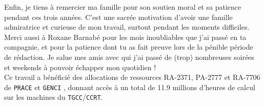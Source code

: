 \begin{intro}
Enfin, je tiens \`a remercier ma famille pour son soutien moral et sa patience pendant ces trois ann\'ees. C'est une sacr\'ee motivation d'avoir une famille admiratrice et curieuse de mon travail, surtout pendant les moments difficiles. Merci aussi \`a Roxane Barnab\'e pour les mois inoubliables que j'ai pass\'e en ta compagnie, et pour la patience dont tu as fait preuve lors de la p\'enible p\'eriode de r\'edaction. Je salue mes amis avec qui j'ai pass\'e de (trop) nombreuses soir\'ees et weekends \`a pouvoir \'echapper mon quotidien ! \\

Ce travail a b\'en\'efici\'e des allocations de ressources RA-2371, PA-2777 et RA-7706 de \texttt{PRACE} et \texttt{GENCI} , donnant acc\`es \`a un total de 11.9 millions d'heures de calcul sur les machines du \texttt{TGCC}/\texttt{CCRT}. 
\end{intro}